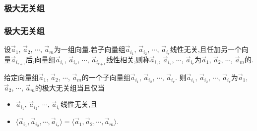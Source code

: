 \subsubsection{极大无关组}
\begin{frame}\frametitle{极大无关组}
\begin{definition}[极大无关组]
设$\vec{a}_1$, $\vec{a}_2$, $\cdots$, $\vec{a}_m$为一组向量.若子向量组$\vec{a}_{i_1}$, $\vec{a}_{i_2}$, $\cdots$, $\vec{a}_{i_r}$线性无关,且任加另一个向量$\vec{a}_{i_{r+1}}$后,向量组$\vec{a}_{i_1}$, $\vec{a}_{i_2}$, $\cdots$, $\vec{a}_{i_{r+1}}$线性相关,则称$\vec{a}_{i_1}$, $\vec{a}_{i_2}$, $\cdots$, $\vec{a}_{i_r}$为$\vec{a}_1$, $\vec{a}_2$, $\cdots$, $\vec{a}_m$的.
\end{definition}
\pp
\begin{proposition}[通过生成子空间来判定极大无关组]
给定向量组$\vec{a}_1$, $\vec{a}_2$, $\cdots$, $\vec{a}_m$的一个子向量组$\vec{a}_{i_1}$, $\vec{a}_{i_2}$, $\cdots$, $\vec{a}_{i_r}$. 则$\vec{a}_{i_1}$, $\vec{a}_{i_2}$, $\cdots$, $\vec{a}_{i_r}$为$\vec{a}_1$, $\vec{a}_2$, $\cdots$, $\vec{a}_m$的极大无关组当且仅当
\begin{itemize}
\item $\vec{a}_{i_1}$, $\vec{a}_{i_2}$, $\cdots$, $\vec{a}_{i_r}$线性无关,且
\item $\langle \vec{a}_{i_1},\vec{a}_{i_2},\cdots,\vec{a}_{i_r}\rangle=\langle\vec{a}_1,\vec{a}_2,\cdots,\vec{a}_m\rangle$.
\end{itemize}
\end{proposition}
\end{frame}



\renewcommand{\mydate}{2025年04月10号\ 第十四次课}




